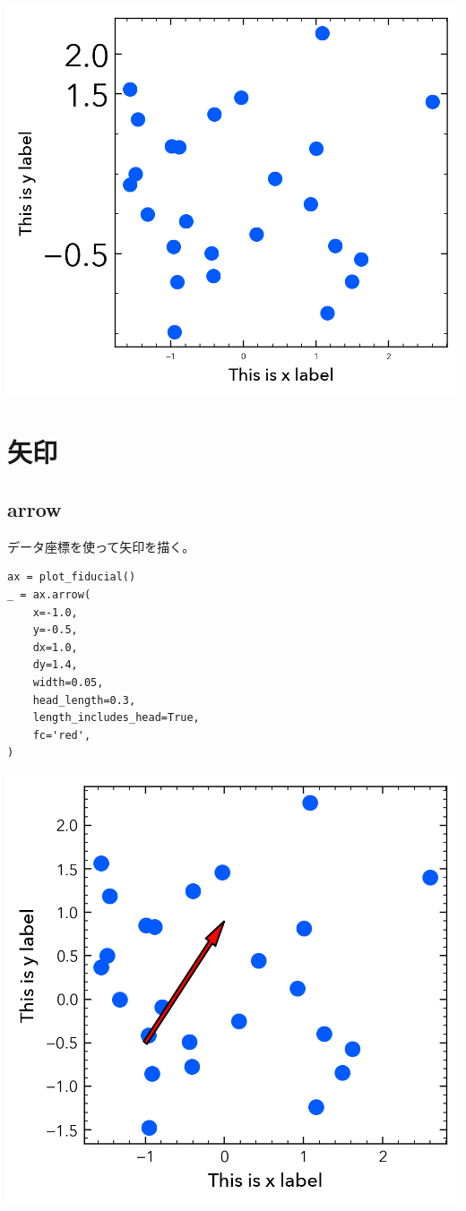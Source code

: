 \documentclass[a4paper, 10pt, notitlepage, twocolumn, uplatex, oneside, dvipdfmx]{jsarticle}
\begin{document}
\begin{center}
\includegraphics[width=.9\linewidth]{./obipy-resources/params_ticks.png}
\end{center}
\section{矢印}
\label{sec:org6e71d31}
\subsection{arrow}
\label{sec:org9630989}
データ座標を使って矢印を描く。
\begin{verbatim}
ax = plot_fiducial()
_ = ax.arrow(
    x=-1.0,
    y=-0.5,
    dx=1.0,
    dy=1.4,
    width=0.05,
    head_length=0.3,
    length_includes_head=True,
    fc='red',
)
\end{verbatim}

\begin{center}
\includegraphics[width=.9\linewidth]{./obipy-resources/params_arrow.png}
\end{center}
\end{document}
